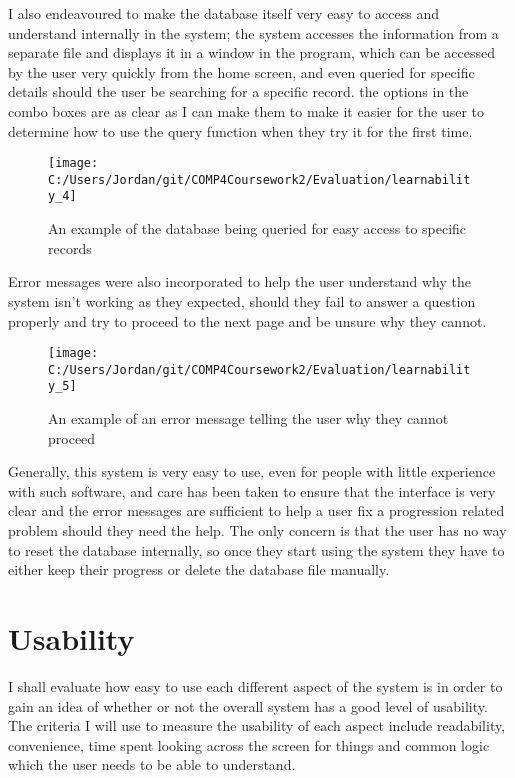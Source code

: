 I also endeavoured to make the database itself very easy to access and understand internally in the system; the system accesses the information from a separate file and displays it in a window in the program, which can be accessed by the user very quickly from the home screen, and even queried for specific details should the user be searching for a specific record. the options in the combo boxes are as clear as I can make them to make it easier for the user to determine how to use the query function when they try it for the first time.

\begin{figure}[H]
	\texttt{[image: C:/Users/Jordan/git/COMP4Coursework2/Evaluation/learnability\_4]}
	\caption{An example of the database being queried for easy access to specific records}
\end{figure}

Error messages were also incorporated to help the user understand why the system isn't working as they expected, should they fail to answer a question properly and try to proceed to the next page and be unsure why they cannot.

\begin{figure}[H]
	\texttt{[image: C:/Users/Jordan/git/COMP4Coursework2/Evaluation/learnability\_5]}
	\caption{An example of an error message telling the user why they cannot proceed}
\end{figure}

Generally, this system is very easy to use, even for people with little experience with such software, and care has been taken to ensure that the interface is very clear and the error messages are sufficient to help a user fix a progression related problem should they need the help. The only concern is that the user has no way to reset the database internally, so once they start using the system they have to either keep their progress or delete the database file manually.

\section{Usability}

I shall evaluate how easy to use each different aspect of the system is in order to gain an idea of whether or not the overall system has a good level of usability. The criteria I will use to measure the usability of each aspect include readability, convenience, time spent looking across the screen for things and common logic which the user needs to be able to understand.

